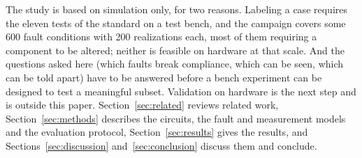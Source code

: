 The study is based on simulation only, for two reasons. Labeling a case requires the eleven
tests of the standard on a test bench, and the campaign covers some 600 fault conditions with
200 realizations each, most of them requiring a component to be altered; neither is feasible on
hardware at that scale. And the questions asked here (which faults break compliance, which can
be seen, which can be told apart) have to be answered before a bench experiment can be designed
to test a meaningful subset. Validation on hardware is the next step and is outside this paper.
Section~\ref{sec:related} reviews related work, Section~\ref{sec:methods} describes the circuits,
the fault and measurement models and the evaluation protocol, Section~\ref{sec:results} gives the
results, and Sections~\ref{sec:discussion} and~\ref{sec:conclusion} discuss them and conclude.

